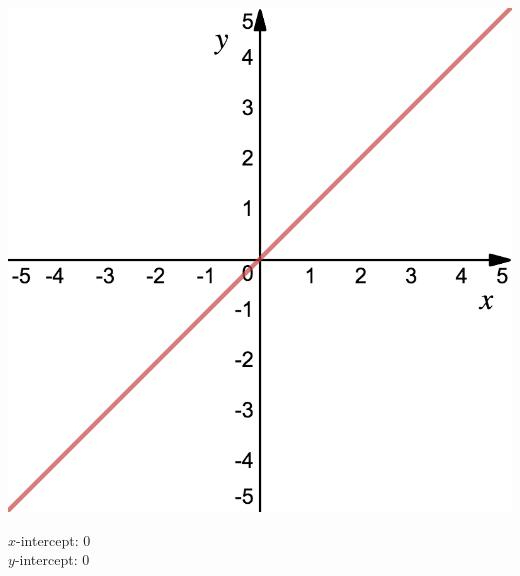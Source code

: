 \vspace{1cm}
\begin{minipage}{0.3\textwidth}%
\includegraphics[width=\linewidth]{pics/ex3.png}
\end{minipage}%
\hfill%
\begin{minipage}{0.6\textwidth}
$x$-intercept: $0$ \\
$y$-intercept: $0$
\end{minipage}


